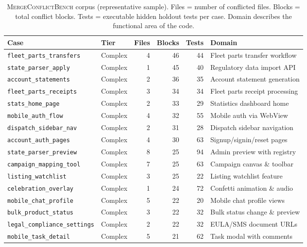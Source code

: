 \documentclass[11pt,letterpaper]{article}
\begin{document}
\begin{table}[H]
\centering
\caption{\textsc{MergeConflictBench} corpus (representative sample). Files = number of conflicted files. Blocks = total conflict blocks. Tests = executable hidden holdout tests per case. Domain describes the functional area of the code.}
\label{tab:corpus}
\small
\begin{tabular}{llrrrl}
\toprule
\textbf{Case} & \textbf{Tier} & \textbf{Files} & \textbf{Blocks} & \textbf{Tests} & \textbf{Domain} \\
\midrule
\texttt{fleet\_parts\_transfers}   & Complex  & 4 & 46 & 44  & Fleet parts transfer workflow \\
\texttt{state\_parser\_apply}      & Complex  & 1 & 45 & 40  & Regulatory data import API \\
\texttt{account\_statements}       & Complex  & 2 & 36 & 35  & Account statement generation \\
\texttt{fleet\_parts\_receipts}    & Complex  & 3 & 34 & 34  & Fleet parts receipt processing \\
\texttt{stats\_home\_page}         & Complex  & 2 & 33 & 29  & Statistics dashboard home \\
\texttt{mobile\_auth\_flow}        & Complex  & 4 & 32 & 55  & Mobile auth via WebView \\
\texttt{dispatch\_sidebar\_nav}    & Complex  & 2 & 31 & 28  & Dispatch sidebar navigation \\
\texttt{account\_auth\_pages}      & Complex  & 4 & 30 & 63  & Signup/signin/reset pages \\
\texttt{state\_parser\_preview}    & Complex  & 8 & 25 & 94  & Admin preview with registry \\
\texttt{campaign\_mapping\_tool}   & Complex  & 7 & 25 & 63  & Campaign canvas \& toolbar \\
\texttt{listing\_watchlist}        & Complex  & 3 & 25 & 22  & Listing watchlist feature \\
\texttt{celebration\_overlay}      & Complex  & 1 & 24 & 72  & Confetti animation \& audio \\
\texttt{mobile\_chat\_profile}     & Complex  & 5 & 22 & 20  & Mobile chat profile views \\
\texttt{bulk\_product\_status}     & Complex  & 3 & 22 & 32  & Bulk status change \& preview \\
\texttt{legal\_compliance\_settings}& Complex & 2 & 22 & 32  & EULA/SMS document URLs \\
\texttt{mobile\_task\_detail}      & Complex  & 5 & 21 & 62  & Task modal with comments \\

\end{tabular}
\end{table}
\end{document}
